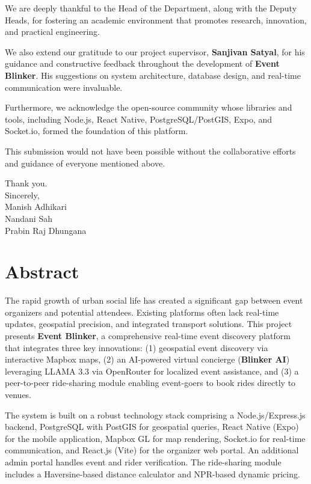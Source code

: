 \documentclass[14pt,a4paper]{extreport}
\begin{document}
We are deeply thankful to the Head of the Department, along with the Deputy Heads, for fostering an academic environment that promotes research, innovation, and practical engineering.

We also extend our gratitude to our project supervisor, \textbf{Sanjivan Satyal}, for his guidance and constructive feedback throughout the development of \textbf{Event Blinker}. His suggestions on system architecture, database design, and real-time communication were invaluable.

Furthermore, we acknowledge the open-source community whose libraries and tools, including Node.js, React Native, PostgreSQL/PostGIS, Expo, and Socket.io, formed the foundation of this platform.

This submission would not have been possible without the collaborative efforts and guidance of everyone mentioned above.

\vspace{1cm}
\noindent Thank you.\\
Sincerely,\\
Manish Adhikari\\
Nandani Sah\\
Prabin Raj Dhungana

\chapter*{Abstract}

The rapid growth of urban social life has created a significant gap between event organizers and potential attendees. Existing platforms often lack real-time updates, geospatial precision, and integrated transport solutions. This project presents \textbf{Event Blinker}, a comprehensive real-time event discovery platform that integrates three key innovations: (1) geospatial event discovery via interactive Mapbox maps, (2) an AI-powered virtual concierge (\textbf{Blinker AI}) leveraging LLAMA 3.3 via OpenRouter for localized event assistance, and (3) a peer-to-peer ride-sharing module enabling event-goers to book rides directly to venues.

The system is built on a robust technology stack comprising a Node.js/Express.js backend, PostgreSQL with PostGIS for geospatial queries, React Native (Expo) for the mobile application, Mapbox GL for map rendering, Socket.io for real-time communication, and React.js (Vite) for the organizer web portal. An additional admin portal handles event and rider verification. The ride-sharing module includes a Haversine-based distance calculator and NPR-based dynamic pricing.
\end{document}
